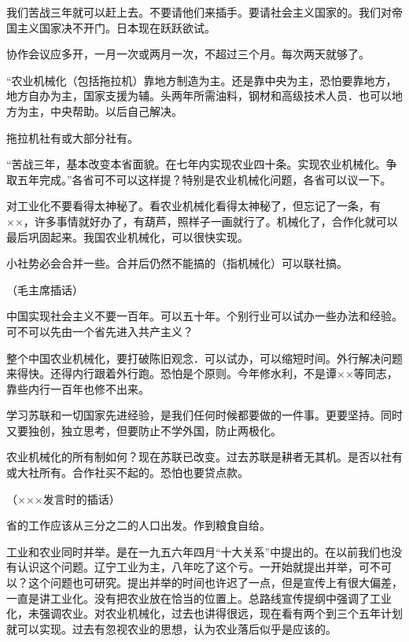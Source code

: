 我们苦战三年就可以赶上去。不要请他们来插手。要请社会主义国家的。我们对帝国主义国家决不开门。日本现在跃跃欲试。

协作会议应多开，一月一次或两月一次，不超过三个月。每次两天就够了。

“农业机械化（包括拖拉机）靠地方制造为主。还是靠中央为主，恐怕要靠地方，地方自办为主，国家支援为辅。头两年所需油料，钢材和高级技术人员．也可以地方为主，中央帮助。以后自己解决。

拖拉机社有或大部分社有。

“苦战三年，基本改变本省面貌。在七年内实现农业四十条。实现农业机械化。争取五年完成。”各省可不可以这样提？特别是农业机械化问题，各省可以议一下。

对工业化不要看得太神秘了。看农业机械化看得太神秘了，但忘记了一条，有××，许多事情就好办了，有葫芦，照样子一画就行了。机械化了，合作化就可以最后巩固起来。我国农业机械化，可以很快实现。

小社势必会合并一些。合并后仍然不能搞的（指机械化）可以联社搞。

（毛主席插话）

中国实现社会主义不要一百年。可以五十年。个别行业可以试办一些办法和经验。可不可以先由一个省先进入共产主义？

整个中国农业机械化，要打破陈旧观念．可以试办，可以缩短时间。外行解决问题来得快。还得内行跟着外行跑。恐怕是个原则。今年修水利，不是谭××等同志，靠些内行一百年也修不出来。

学习苏联和一切国家先进经验，是我们任何时候都要做的一件事。更要坚持。同时又要独创，独立思考，但要防止不学外国，防止两极化。

农业机械化的所有制如何？现在苏联已改变。过去苏联是耕者无其机。是否以社有或大社所有。合作社买不起的。恐怕也要贷点款。

（×××发言时的插话）

省的工作应该从三分之二的人口出发。作到粮食自给。

工业和农业同时并举。是在一九五六年四月“十大关系”中提出的。在以前我们也没有认识这个问题。辽宁工业为主，八年吃了这个亏。一开始就提出并举，可不可以？这个问题也可研究。提出并举的时间也许迟了一点，但是宣传上有很大偏差，一直是讲工业化。没有把农业放在恰当的位置上。总路线宣传提纲中强调了工业化，未强调农业。对农业机械化，过去也讲得很远，现在看有两个到三个五年计划就可以实现。过去有忽视农业的思想，认为农业落后似乎是应该的。

